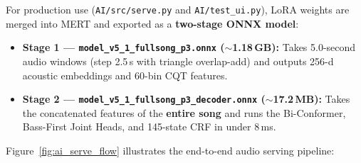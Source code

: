 \documentclass[a4paper]{article}
\begin{document}
For production use (\texttt{AI/src/serve.py} and \texttt{AI/test\_ui.py}), LoRA weights are merged into MERT and exported as a \textbf{two-stage ONNX model}:
\begin{itemize}
    \item \textbf{Stage 1 --- \texttt{model\_v5\_1\_fullsong\_p3.onnx} ($\sim$1.18\,GB):} Takes 5.0-second audio windows (step 2.5\,s with triangle overlap-add) and outputs 256-d acoustic embeddings and 60-bin CQT features.
    \item \textbf{Stage 2 --- \texttt{model\_v5\_1\_fullsong\_p3\_decoder.onnx} ($\sim$17.2\,MB):} Takes the concatenated features of the \textbf{entire song} and runs the Bi-Conformer, Bass-First Joint Heads, and 145-state CRF in under 8\,ms.
\end{itemize}

Figure~\ref{fig:ai_serve_flow} illustrates the end-to-end audio serving pipeline:
\end{document}
